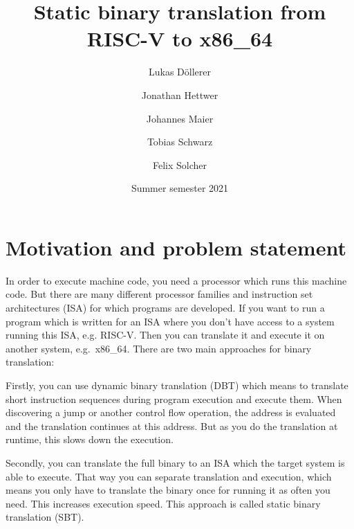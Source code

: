 \documentclass[course=eragp]{aspdoc}
\author{Lukas Döllerer \and Jonathan Hettwer \and Johannes Maier \and Tobias Schwarz \and Felix Solcher}
\date{Summer semester 2021}
\title{Static binary translation from RISC-V to x86\_64}
\begin{document}
\maketitle

\tableofcontents

\pagebreak

\section{Motivation and problem statement}


In order to execute machine code, you need a processor which runs this machine code. But there are
many different processor families and instruction set architectures (ISA) for which programs are
developed. If you want to run a program which is written for an ISA where you don't have access to a
system running this ISA, e.g. RISC-V. Then you can translate it and execute it on another system,
e.g.\ x86\_64. There are two main approaches for binary translation: 

\par

Firstly, you can use dynamic binary translation (DBT) which means to translate short instruction 
sequences during program execution and execute them. When discovering a jump or another control 
flow operation, the address is evaluated and the translation continues at this address. But as 
you do the translation at runtime, this slows down the execution. 

\par

Secondly, you can translate the full binary to an ISA which the target system is able to execute.
That way you can separate translation and execution, which means you only have to translate the 
binary once for running it as often you need. This increases execution speed. This approach 
is called static binary translation (SBT).
\end{document}
